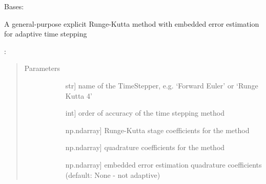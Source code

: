 \documentclass[letterpaper,10pt,english]{sphinxmanual}
\begin{document}

\begin{fulllineitems}
\label{\detokenize{spitfire.time.methods:spitfire.time.methods.GeneralAdaptiveExplicitRungeKutta}}
Bases: {\hyperref[\detokenize{spitfire.time.methods:spitfire.time.methods.AdaptiveExplicitRungeKutta}]{}}

A general-purpose explicit Runge-Kutta method with embedded error estimation for adaptive time stepping

:
\begin{quote}\begin{description}
\item[{Parameters}] \leavevmode\begin{description}
\item[{}] \leavevmode{[}str{]}
name of the TimeStepper, e.g. ‘Forward Euler’ or ‘Runge Kutta 4’

\item[{}] \leavevmode{[}int{]}
order of accuracy of the time stepping method

\item[{}] \leavevmode{[}np.ndarray{]}
Runge-Kutta stage coefficients for the method

\item[{}] \leavevmode{[}np.ndarray{]}
quadrature coefficients for the method

\item[{}] \leavevmode{[}np.ndarray{]}
embedded error estimation quadrature coefficients (default: None - not adaptive)

\end{description}

\end{description}\end{quote}


\end{fulllineitems}
\end{document}
